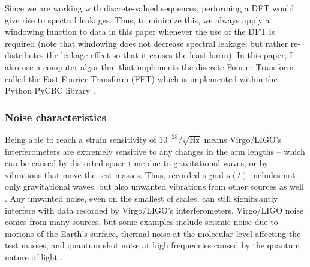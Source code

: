 \documentclass[preprint,
letterpaper,
 amsmath,amssymb,
 aps,
]{revtex4-2}
\begin{document}
Since we are working with discrete-valued sequences, performing a DFT would give rise to spectral leakages. Thus, to minimize this, we always apply a windowing function to data in this paper whenever the use of the DFT is required (note that windowing does not decrease spectral leakage, but rather re-distributes the leakage effect so that it causes the least harm). In this paper, I also use a computer algorithm that implements the discrete Fourier Transform called the Fast Fourier Transform (FFT) which is implemented within the Python PyCBC library \cite{numpy}.

\subsubsection{Noise characteristics}
Being able to reach a strain sensitivity of $10^{-23}/\sqrt{\text{Hz}}$ \cite{sensitivity} means Virgo/LIGO's interferometers are extremely sensitive to any changes in the arm lengths – which can be caused by distorted space-time due to gravitational waves, or by vibrations that move the test masses. Thus, recorded signal $s(t)$ includes not only gravitational waves, but also unwanted vibrations from other sources as well \cite{ultimate}. Any unwanted noise, even on the smallest of scales, can still significantly interfere with data recorded by Virgo/LIGO's interferometers. Virgo/LIGO noise comes from many sources, but some examples include seismic noise due to motions of the Earth's surface, thermal noise at the molecular level affecting the test masses, and quantum shot noise at high frequencies caused by the quantum nature of light \cite{blair_howell_ju_zhao_2012}.
\end{document}
